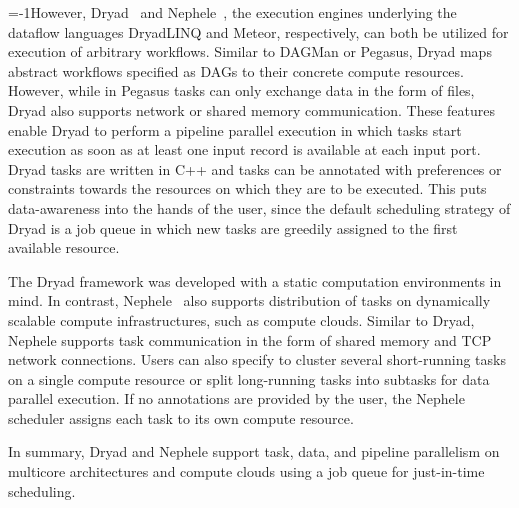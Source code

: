 \looseness=-1However, Dryad~\citep{Isard07} and Nephele~\citep{Warneke09}, the execution engines underlying the dataflow languages DryadLINQ and Meteor, respectively, can both be utilized for execution of arbitrary workflows. Similar to DAGMan or Pegasus, Dryad maps abstract workflows specified as DAGs to their concrete compute resources. However, while in Pegasus tasks can only exchange data in the form of files, Dryad also supports network or shared memory communication. These features enable Dryad to perform a pipeline parallel execution in which tasks start execution as soon as at least one input record is available at each input port. Dryad tasks are written in C++ and tasks can be annotated with preferences or constraints towards the resources on which they are to be executed. This puts data-awareness into the hands of the user, since the default scheduling strategy of Dryad is a job queue in which new tasks are greedily assigned to the first available resource. 

The Dryad framework was developed with a static computation environments in mind. In contrast, Nephele~\citep{Warneke09} also supports distribution of tasks on dynamically scalable compute infrastructures, such as compute clouds. Similar to Dryad, Nephele supports task communication in the form of shared memory and TCP network connections. Users can also specify to cluster several short-running tasks on a single compute resource or split long-running tasks into subtasks for data parallel execution. If no annotations are provided by the user, the Nephele scheduler assigns each task to its own compute resource. 

In summary, Dryad and Nephele support task, data, and pipeline parallelism on multicore architectures and compute clouds using a job queue for just-in-time scheduling.













